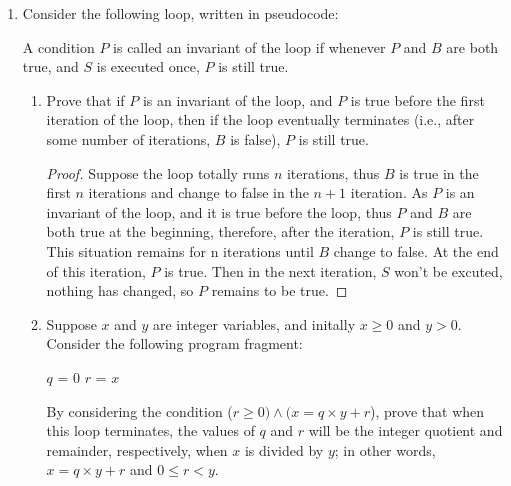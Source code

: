 \documentclass[12pt,a4paper]{article}
\theoremstyle{definition}
\numberwithin{equation}{section}
\numberwithin{figure}{section}
\begin{document}
\begin{enumerate}
\item Consider the following loop, written in pseudocode:

\begin{center}
\begin{minipage}[b]{0.2\textwidth}
\begin{algorithm}[H]
\end{algorithm}
\end{minipage}
\end{center}


A condition $P$ is called an invariant of the loop if whenever $P$ and $B$ are both true, and $S$ is executed once, $P$ is still true.

\begin{enumerate}
  \item Prove that if $P$ is an invariant of the loop, and $P$ is true before the first iteration of the loop, then if the loop eventually terminates (i.e., after some number of iterations, $B$ is false), $P$ is still true.
  \begin{proof} Suppose the loop totally runs $n$ iterations, thus $B$ is true in the first $n$ iterations and change to false in the $n+1$ iteration. As $P$ is an invariant of the loop, and it is true before the loop, thus $P$ and $B$ are both true at the beginning, therefore, after the iteration, $P$ is still true. This situation remains for n iterations until $B$ change to false. At the end of this iteration, $P$ is true. Then in the next iteration, $S$ won't be excuted, nothing has changed, so $P$ remains to be true.  
  \end{proof}
  
  \item Suppose $x$ and $y$ are integer variables, and initally $x\ge 0$ and $y > 0$. Consider the following program fragment:

\begin{center}
\begin{minipage}[b]{0.25\textwidth}
\begin{algorithm}[H]
   $q$ = 0\;
   $r$ = $x$\;
\end{algorithm}
\end{minipage}
\end{center}

By considering the condition ($r\ge 0) \wedge (x=q \times y+r$), prove that when this loop terminates, the values of $q$ and $r$ will be the integer quotient and remainder, respectively, when $x$ is divided by $y$; in other words, $x=q \times y+r$ and $0 \le r <y$.


\end{enumerate}
\end{enumerate}
\end{document}
